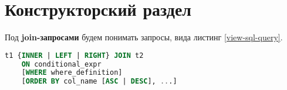 \chapter{Конструкторский раздел}

Под \textbf{join-запросами} будем понимать запросы, вида листинг \ref{view-sql-query}.

\begin{lstlisting}[language=sql, caption={Вид sql запроса},label=view-sql-query]
t1 {INNER | LEFT | RIGHT} JOIN t2
    ON conditional_expr
    [WHERE where_definition]
    [ORDER BY col_name [ASC | DESC], ...]
\end{lstlisting}



